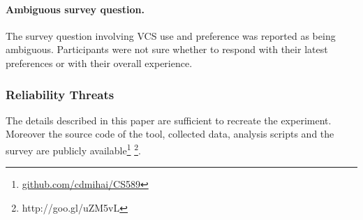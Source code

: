 \documentclass[letterpaper]{article}
\begin{document}
\paragraph{Ambiguous survey question.}
The survey question involving VCS use and preference was reported as being ambiguous.
Participants were not sure whether to respond with their latest preferences or with their overall experience.

\subsubsection{Reliability Threats}

The details described in this paper are sufficient to recreate the experiment.
Moreover the source code of the tool, collected data, analysis scripts and the survey are publicly available\footnote{\url{github.com/cdmihai/CS589}} \footnote{http://goo.gl/uZM5vL}.
\end{document}
